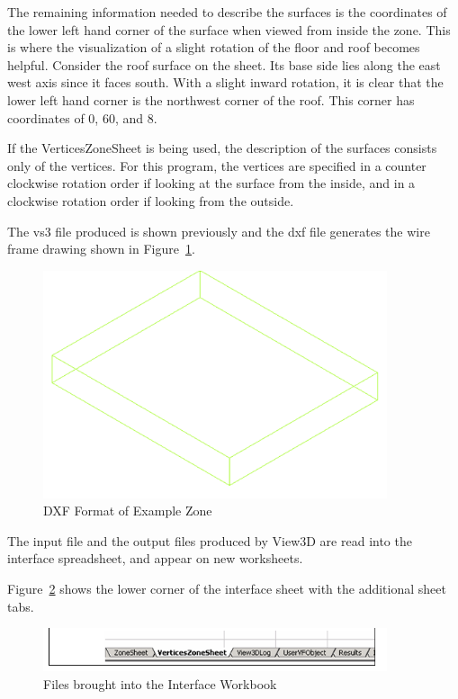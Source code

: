 The remaining information needed to describe the surfaces is the coordinates of the lower left hand corner of the surface when viewed from inside the zone. This is where the visualization of a slight rotation of the floor and roof becomes helpful. Consider the roof surface on the sheet. Its base side lies along the east west axis since it faces south. With a slight inward rotation, it is clear that the lower left hand corner is the northwest corner of the roof. This corner has coordinates of 0, 60, and 8.

If the VerticesZoneSheet is being used, the description of the surfaces consists only of the vertices. For this program, the vertices are specified in a counter clockwise rotation order if looking at the surface from the inside, and in a clockwise rotation order if looking from the outside.

The vs3 file produced is shown previously and the dxf file generates the wire frame drawing shown in Figure~\ref{fig:dxf-format-of-example-zone}.

\begin{figure}[hbtp] %
\centering
\includegraphics[width=0.9\textwidth, height=0.9\textheight, keepaspectratio=true]{media/image024.png}
\caption{DXF Format of Example Zone \protect \label{fig:dxf-format-of-example-zone}}
\end{figure}

The input file and the output files produced by View3D are read into the interface spreadsheet, and appear on new worksheets.

Figure~\ref{fig:files-brought-into-the-interface-workbook} shows the lower corner of the interface sheet with the additional sheet tabs.

\begin{figure}[hbtp] %
\centering
\includegraphics[width=0.9\textwidth, height=0.9\textheight, keepaspectratio=true]{media/image025.png}
\caption{Files brought into the Interface Workbook \protect \label{fig:files-brought-into-the-interface-workbook}}
\end{figure}

